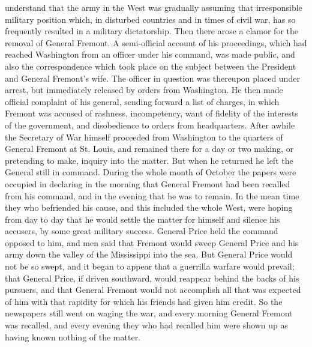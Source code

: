 understand that the army in the West was gradually assuming that
irresponsible military position which, in disturbed countries and
in times of civil war, has so frequently resulted in a military
dictatorship.  Then there arose a clamor for the removal of General
Fremont.  A semi-official account of his proceedings, which had
reached Washington from an officer under his command, was made
public, and also the correspondence which took place on the subject
between the President and General Fremont's wife.  The officer in
question was thereupon placed under arrest, but immediately
released by orders from Washington.  He then made official
complaint of his general, sending forward a list of charges, in
which Fremont was accused of rashness, incompetency, want of
fidelity of the interests of the government, and disobedience to
orders from headquarters.  After awhile the Secretary of War
himself proceeded from Washington to the quarters of General
Fremont at St. Louis, and remained there for a day or two making,
or pretending to make, inquiry into the matter.  But when he
returned he left the General still in command.  During the whole
month of October the papers were occupied in declaring in the
morning that General Fremont had been recalled from his command,
and in the evening that he was to remain.  In the mean time they
who befriended his cause, and this included the whole West, were
hoping from day to day that he would settle the matter for himself
and silence his accusers, by some great military success.  General
Price held the command opposed to him, and men said that Fremont
would sweep General Price and his army down the valley of the
Mississippi into the sea.  But General Price would not be so swept,
and it began to appear that a guerrilla warfare would prevail; that
General Price, if driven southward, would reappear behind the backs
of his pursuers, and that General Fremont would not accomplish all
that was expected of him with that rapidity for which his friends
had given him credit.  So the newspapers still went on waging the
war, and every morning General Fremont was recalled, and every
evening they who had recalled him were shown up as having known
nothing of the matter.

